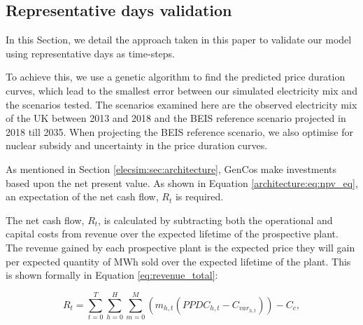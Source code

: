 \subsection{Representative days validation}
\label{elecsim:ssec:representative_validation}

In this Section, we detail the approach taken in this paper to validate our model using representative days as time-steps. 

To achieve this, we use a genetic algorithm to find the predicted price duration curves, which lead to the smallest error between our simulated electricity mix and the scenarios tested. The scenarios examined here are the observed electricity mix of the UK between 2013 and 2018 and the BEIS reference scenario projected in 2018 till 2035. When projecting the BEIS reference scenario, we also optimise for nuclear subsidy and uncertainty in the price duration curves.






As mentioned in Section \ref{elecsim:sec:architecture}, GenCos make investments based upon the net present value. As shown in Equation \ref{architecture:eq:npv_eq}, an expectation of the net cash flow, $R_t$ is required. 

The net cash flow, $R_t$, is calculated by subtracting both the operational and capital costs from revenue over the expected lifetime of the prospective plant. The revenue gained by each prospective plant is the expected price they will gain per expected quantity of MWh sold over the expected lifetime of the plant. This is shown formally in Equation \ref{eq:revenue_total}:


\begin{equation}
\label{eq:revenue_total}
R_t = 
\sum\limits_{t=0}^T 
\sum\limits_{h=0}^H
\sum\limits_{m=0}^M \left(
m_{h,t}(PPDC_{h,t}
-
C_{var_{h,t}})\right)
- C_c,
\end{equation}

